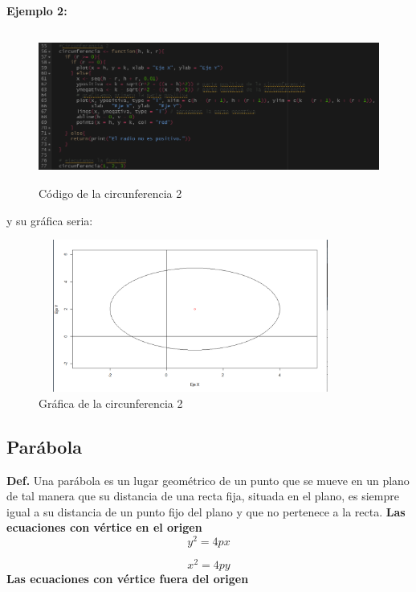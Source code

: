 \documentclass{article}
\begin{document}
\newpage

\textbf{Ejemplo 2:}


\begin{figure}[h]
    \centering
    \includegraphics[width=12cm, height=5cm]{Codigocircu2}
    \caption{Código de la circunferencia 2}
    \label{fig:mesh5}
\end{figure}
y su gráfica seria:
\begin{figure}[h]
    \centering
    \includegraphics[width=10cm, height=5cm]{Grafica4}
    \caption{Gráfica de la circunferencia 2}
    \label{fig:mesh6}
\end{figure}



\subsection{Parábola}
\textbf{Def.} Una parábola es un lugar geométrico de un punto que se mueve en un plano de tal manera que su distancia de una recta fija, situada en el plano, es siempre igual a su distancia de un punto fijo del plano y que no pertenece a la recta.
\newline
\textbf{Las ecuaciones con vértice en el origen}
\begin{equation}
    y^2 = 4px
\end{equation}

\begin{equation}
    x^2 = 4py
\end{equation}
\newline
\textbf{Las ecuaciones con vértice fuera del origen}
\end{document}

